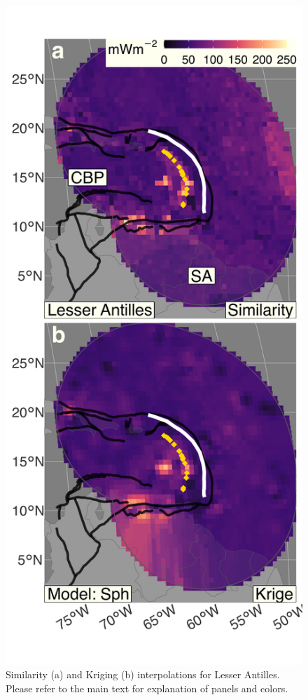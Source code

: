 \begin{figure}[htbp]

{\centering \includegraphics[width=1\linewidth,]{assets/figs/chpt3/LesserAntillesDiffComp} 

}

\caption[Similarityand Kriging interpolations for Lesser Antilles]{Similarity (a) and Kriging (b) interpolations for Lesser Antilles. Please refer to the main text for explanation of panels and colors.}\label{fig:lesserAntillesDiff}
\end{figure}

